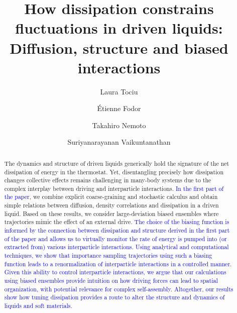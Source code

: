 \documentclass[superscriptaddress, twocolumn, prx, longbibliography, nofootinbib]{revtex4-1}
\begin{document}
\title{How dissipation constrains fluctuations in driven liquids:\\Diffusion, structure and biased interactions}
\author{Laura Tociu}

\author{\'Etienne Fodor}

\author{Takahiro Nemoto}

\author{Suriyanarayanan Vaikuntanathan}

\begin{abstract}

The dynamics and structure of driven liquids generically hold the signature of the net dissipation of energy in the thermostat. Yet, disentangling precisely how dissipation changes collective effects remains challenging in many-body systems due to the complex interplay between driving and interparticle interactions. \textcolor{blue}{In the first part of the paper}, we combine explicit coarse-graining and stochastic calculus and obtain simple relations between diffusion, density correlations and dissipation in a driven liquid. Based on these results, we consider large-deviation biased ensembles where trajectories mimic the effect of an external drive. \textcolor{blue}{The choice of the biasing function is informed by the connection between dissipation and structure derived in the first part of the paper and allows us to virtually monitor the rate of energy is pumped into (or extracted from) various interparticle interactions. Using analytical and computational techniques, we show that importance sampling trajectories using such a biasing function leads to a renormalization of interparticle interactions in a controlled manner. Given this ability to control interparticle interactions, we argue that our calculations using biased ensembles provide intuition on how driving forces can lead to spatial organization, with potential relevance for complex self-assembly. Altogether, our results show how tuning dissipation provides a route to alter the structure and dynamics of liquids and soft materials.}

\end{abstract}
\end{document}
